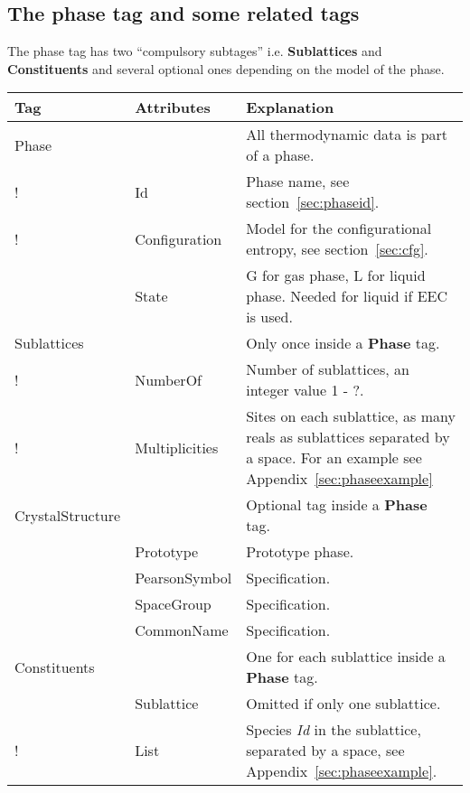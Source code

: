 \documentclass{article}
\begin{document}

\subsection{The phase tag and some related tags}\label{sec:phase}\label{sec:dispart}

The phase tag has two ``compulsory subtages'' i.e. {\bf Sublattices}
and {\bf Constituents} and several optional ones depending on the
model of the phase.

\begin{tabular}{|p{} p{} p{}|}\hline
  Tag & Attributes & Explanation\\\hline

  Phase & & All thermodynamic data is part of a phase.\\
!       & Id & Phase name, see section~\ref{sec:phaseid}. \\
!       & Configuration &  Model for the configurational entropy, see section~\ref{sec:cfg}.\\
       & State & G for gas phase, L for liquid phase.  Needed for liquid
                 if EEC is used.\\\hline

  Sublattices & & Only once inside a {\bf Phase} tag.\\
!        & NumberOf &  Number of sublattices, an integer value 1 - ?. \\
!        & Multiplicities & Sites on each sublattice, as many reals as
           sublattices separated by a space.  For an example 
           see Appendix~\ref{sec:phaseexample}\\\hline

  CrystalStructure & & Optional tag inside a {\bf Phase} tag.\\
        & Prototype & Prototype phase.\\
        & PearsonSymbol & Specification.\\
        & SpaceGroup & Specification.\\
        & CommonName & Specification.\\\hline

  Constituents & & One for each sublattice inside a {\bf Phase} tag.\\
               & Sublattice & Omitted if only one sublattice.\\
!              & List &  Species {\em Id} in the sublattice,
               separated by a space, see Appendix~\ref{sec:phaseexample}.\\\hline


\end{tabular}
\end{document}
